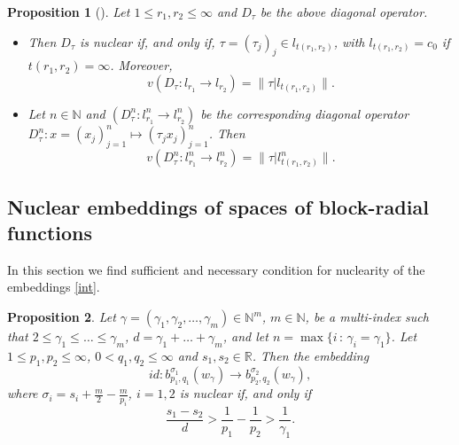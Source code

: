 \documentclass[12pt]{article}
\newtheorem{Prop}{Proposition}
\newcommand{\R}{{\mathbb R}}
\newcommand{\N}{{\mathbb N}}
\begin{document}
\begin{Prop}[{\cite[Thms. 4.3, 4.4]{To}}]
	\label{Pro2}	
	 Let $1\leq r_1, r_2 \leq\infty$ and $D_\tau$ be the above diagonal operator.
	 \begin{itemize}
	 	\item[(i)] Then $D_\tau$ is nuclear if, and only if, $\tau=(\tau_j)_j\in l_{t(r_1,r_2)}$, with $l_{t(r_1,r_2)}=c_0$ if $t(r_1,r_2)=\infty$. Moreover,
	 	$$
	 	v(D_\tau:l_{r_1}\rightarrow l_{r_2})=\|\tau|l_{t(r_1,r_2)}\|.
	 	$$
\item[(ii)] Let $n\in\N$ and $(D_\tau^n:l_{r_1}^n\rightarrow l_{r_2}^n)$ be the corresponding diagonal operator $D_\tau^n: x=(x_j)^n_{j=1}\mapsto (\tau_j x_j)_{j=1}^n$. Then
$$
v(D_\tau^n:l_{r_1}^n\rightarrow l_{r_2}^n)=\|\tau|l_{t(r_1,r_2)}^n\|.
$$

	 	
	 	\end{itemize}
\end{Prop}



\subsection{Nuclear embeddings of spaces of block-radial functions}

In this section we find sufficient and necessary condition for nuclearity of the embeddings \eqref{int}. 

\begin{Prop} \label{main1seq}
	Let $\gamma= (\gamma_1 , \gamma_2, \ldots , \gamma_m)\in \N^m$, $m\in \N$,   be a multi-index such that 
	$2\le \gamma_1\le \ldots \le \gamma_m$, %
	$d= \gamma_1+ \ldots + \gamma_m$, and let $n = \max\{ i\,:\, \gamma_i=\gamma_1\}$.  %
	Let $1\le p_1,p_2\le\infty$, $0<q_1,q_2\le \infty$ and  $s_1,s_2\in \R$.  Then the embedding 
	\begin{equation*}
id: b^{\sigma_1}_{p_1,q_1}( w_\gamma)\rightarrow  b^{\sigma_2}_{p_2,q_2}( w_\gamma),
	\end{equation*}
	where $\sigma_i= s_i +\frac{m}{2}- \frac{m}{p_i}$, $i=1,2$ is nuclear if, and only if
	\begin{equation}
	\label{c1}
 \frac{s_1 - s_2}{d}> \frac{1}{p_1}- \frac{1}{p_2}>\frac{1}{\gamma_{1}}. 
	\end{equation}
\end{Prop}
\end{document}
